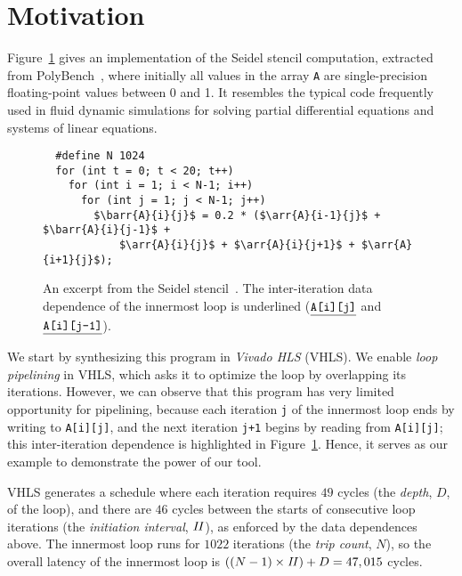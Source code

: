 \section{Motivation}
\label{lo:sec:motivation}


\newcommand\arr[3]{\texttt{#1[#2][#3]}}
\newcommand\barr[3]{\texttt{\underline{#1[#2][#3]}}}

Figure~\ref{lo:fig:seidel_prog} gives an implementation of the Seidel stencil
computation, extracted from PolyBench~\cite{polybench}, where initially all
values in the array \verb|A| are single-precision floating-point values between
0 and 1.  It resembles the typical code frequently used in fluid dynamic
simulations for solving partial differential equations and systems of linear
equations.

\begin{figure}[ht]
\begin{lstlisting}
  #define N 1024
  for (int t = 0; t < 20; t++)
    for (int i = 1; i < N-1; i++)
      for (int j = 1; j < N-1; j++)
        $\barr{A}{i}{j}$ = 0.2 * ($\arr{A}{i-1}{j}$ + $\barr{A}{i}{j-1}$ +
            $\arr{A}{i}{j}$ + $\arr{A}{i}{j+1}$ + $\arr{A}{i+1}{j}$);
\end{lstlisting}
    \caption{%
        An excerpt from the Seidel stencil~\cite{polybench}.  The
        inter-iteration data dependence of the innermost loop is underlined
        ($\barr{A}{i}{j}$ and $\barr{A}{i}{j-1}$).
    }\label{lo:fig:seidel_prog}
\end{figure}

We start by synthesizing this program in \emph{Vivado HLS} (VHLS)\@.  We
enable \emph{loop pipelining} in VHLS, which asks it to optimize the loop by
overlapping its iterations.  However, we can observe that this program has
very limited opportunity for pipelining, because each iteration \verb|j| of
the innermost loop ends by writing to \verb|A[i][j]|, and the next iteration
\verb|j+1| begins by reading from \verb|A[i][j]|; this inter-iteration
dependence is highlighted in Figure~\ref{lo:fig:seidel_prog}.  Hence, it serves
as our example to demonstrate the power of our tool.

VHLS generates a schedule where each iteration requires $49$ cycles (the
\emph{depth}, $D$, of the loop), and there are $46$ cycles between the starts
of consecutive loop iterations (the \emph{initiation interval}, $\mathit{II}$),
as enforced by the data dependences above.  The innermost loop runs for
$1022$ iterations (the \emph{trip count}, $N$), so the overall latency of the
innermost loop is $((N-1) \times \mathit{II}) + D = 47,015$ cycles.

